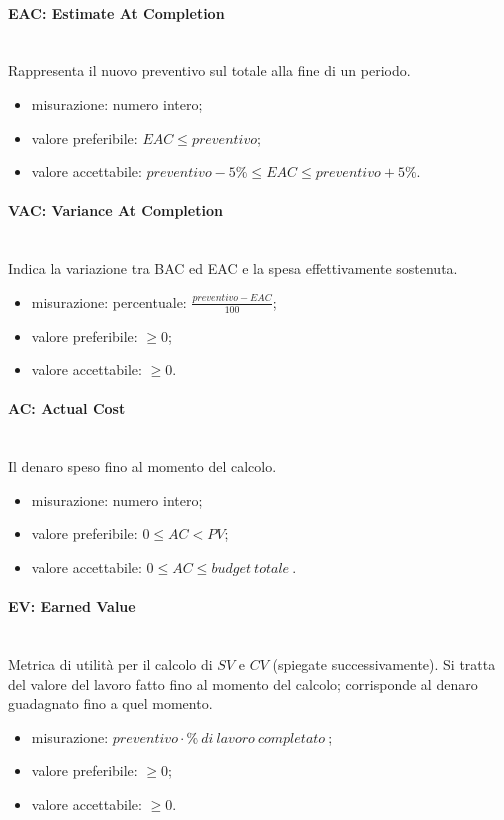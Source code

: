 			\paragraph*{EAC: Estimate At Completion}\mbox{}\\
			Rappresenta il nuovo preventivo sul totale alla fine di un periodo.
			\begin{itemize}
				\item  misurazione: numero intero;
				\item  valore preferibile: $ EAC \leq preventivo$;
				\item  valore accettabile: $ preventivo -5\% \leq EAC \leq preventivo + 5\%$. 
			\end{itemize}
			
			\paragraph*{VAC: Variance At Completion}\mbox{}\\
			Indica la variazione tra BAC ed EAC e la spesa effettivamente sostenuta.
			\begin{itemize}
				\item  misurazione: percentuale: $\frac{preventivo - EAC}{100}$;
				\item  valore preferibile: $\geq 0$;
				\item  valore accettabile: $\geq 0$.
			\end{itemize}
				
			\paragraph*{AC: Actual Cost}\mbox{}\\
			Il denaro speso fino al momento del calcolo.
			\begin{itemize}
				\item  misurazione: numero intero;
				\item  valore preferibile: $0 \leq AC < PV$;
				\item  valore accettabile: $0 \leq AC \leq budget\ totale\ $.
			\end{itemize}
		
			\paragraph*{EV: Earned Value}\mbox{}\\
			Metrica di utilità per il calcolo di $SV$ e $CV$ (spiegate successivamente). Si tratta del valore del lavoro fatto fino al momento del calcolo; corrisponde al denaro guadagnato fino a quel momento.
			\begin{itemize}
				\item  misurazione: $preventivo \cdot \%\ di\ lavoro\ completato\ $;
				\item  valore preferibile: $ \geq 0$;
				\item  valore accettabile: $ \geq 0$.
			\end{itemize}
